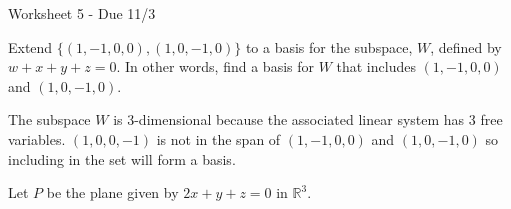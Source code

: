 \documentclass{exam}
\begin{document}
\begin{center}
    Worksheet 5 - Due 11/3
\end{center}

\begin{questions}
    \question
    Extend $\{(1,-1,0,0),(1,0,-1,0)\}$ to a basis for the subspace, $W$, defined by
    $w+x+y+z=0$. In other words, find a basis for $W$ that includes
    $(1,-1,0,0)$ and $(1,0,-1,0)$.

    \begin{solution}
        The subspace $W$ is 3-dimensional because the associated linear system
        has 3 free variables. $(1,0,0,-1)$ is not in the span of $(1,-1,0,0)$
        and $(1,0,-1,0)$ so including in the set will form a basis.
    \end{solution}

    \question
    Let $P$ be the plane given by $2x+y+z=0$ in $\mathbb{R}^3$.
\end{questions}
\end{document}
